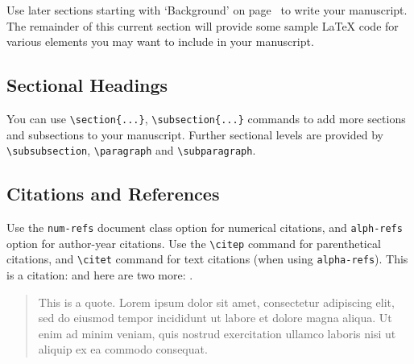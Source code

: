 \documentclass[a4paper,num-refs]{oup-contemporary}
\begin{document}

Use later sections starting with `Background' on page~\pageref{sec:background} to write your manuscript. The remainder of this current section will provide some sample \LaTeX{} code for various elements you may want to include in your manuscript.

\subsection{Sectional Headings}
You can use \verb|\section{...}|, \verb|\subsection{...}| commands to add more sections and subsections to your manuscript. Further sectional levels are provided by \verb|\subsubsection|, \verb|\paragraph| and \verb|\subparagraph|.

\subsection{Citations and References}
Use the \verb|num-refs| document class option for numerical citations, and \verb|alph-refs| option for author-year citations.
Use the \verb|\citep| command for parenthetical citations, and \verb|\citet| command for text citations (when using \verb|alpha-refs|).
This is a citation: \citep{Fan:2004} and here are two more: \citep{Cox:1972,Hear:Holm:Step:quan:2006}.

\begin{quote}
This is a quote. Lorem ipsum dolor sit amet, consectetur adipiscing elit, sed do eiusmod tempor incididunt ut labore et dolore magna aliqua. Ut enim ad minim veniam, quis nostrud exercitation ullamco laboris nisi ut aliquip ex ea commodo consequat.
\end{quote}
\end{document}
